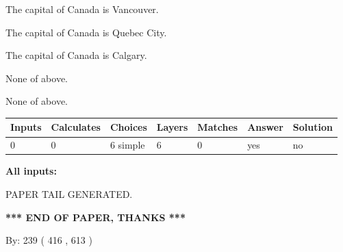 \documentclass[12pt]{article}
\begin{document}
 
The capital of Canada is Vancouver.
 
 
The capital of Canada is Quebec City.
 
 
The capital of Canada is Calgary.
 
 
 None of above.
 
 
\noindent{}
 
 
 None of above.
 
 
\noindent{}
 
 
   
   
   
   
\noindent\begin{tabular}{|l|l|l|l|l|l|l|}
 \hline
Inputs & Calculates & Choices & Layers & Matches & Answer & Solution \\ \hline
 0  & 
 0  & 
 6
  simple  
  & 
 6  & 
 0  & 
  yes & 
  no 
  \\ \hline
 \end{tabular}
   
   
   
   
\noindent{}
   
   
   
   
\noindent\vspace{0.1in}\hspace{-0.08in} {\textbf{\Large{All inputs: }}}
   
   
   
   
   
   
 \vspace{0.2in}
 
   
   
\vspace{2.0in} PAPER TAIL GENERATED.
   
   
   
   
\vspace{1.0in} 
{\textbf{\large{ *** END OF PAPER, THANKS *** }}} 
   
   
\hspace{1.0in} By: 
 239 ( 416 ,  613 )
   
   
   
   
\newpage 
\setcounter{page}{ 
   464001 } 
   
\end{document}
